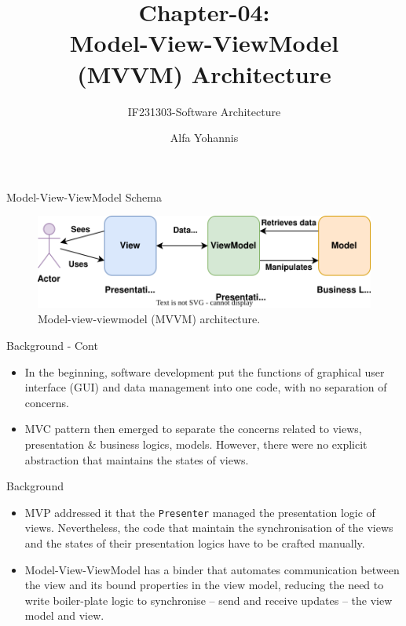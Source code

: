 \documentclass[aspectratio=169, table]{beamer}
\title{Chapter-04:\\Model-View-ViewModel \\ (MVVM) Architecture}
\subtitle{IF231303-Software Architecture}
\author{Alfa Yohannis}
\begin{document}
	\begin{frame}[plain]
		\maketitle
	\end{frame}

	\begin{frame}{Model-View-ViewModel Schema}
		\begin{figure}[h]
			\centering
			\includegraphics[width=\textwidth]{mvvm}
			\caption{Model-view-viewmodel (MVVM) architecture.}
			\label{fig:mvvm}
		\end{figure}
	\end{frame}

	\begin{frame}{Background - Cont}
		\begin{itemize}
			\item In the beginning, software development put the functions of graphical user interface (GUI) and data management into one code, with no separation of concerns.
			\item MVC pattern then emerged to separate the concerns related to views, presentation \& business logics, models. However, there were no explicit abstraction that maintains the states of views.

		\end{itemize}
	\end{frame}

		\begin{frame}{Background}
		\begin{itemize}

			\item MVP addressed it that the \texttt{Presenter} managed the presentation logic of views.
			Nevertheless, the code that maintain the synchronisation of the views and the states of their presentation logics have to be crafted manually.
			\item Model-View-ViewModel has a binder that automates communication between the view and its bound properties in the view model, reducing the need to write boiler-plate logic to synchronise -- send and receive updates -- the view model and view.
		\end{itemize}
	\end{frame}
\end{document}
